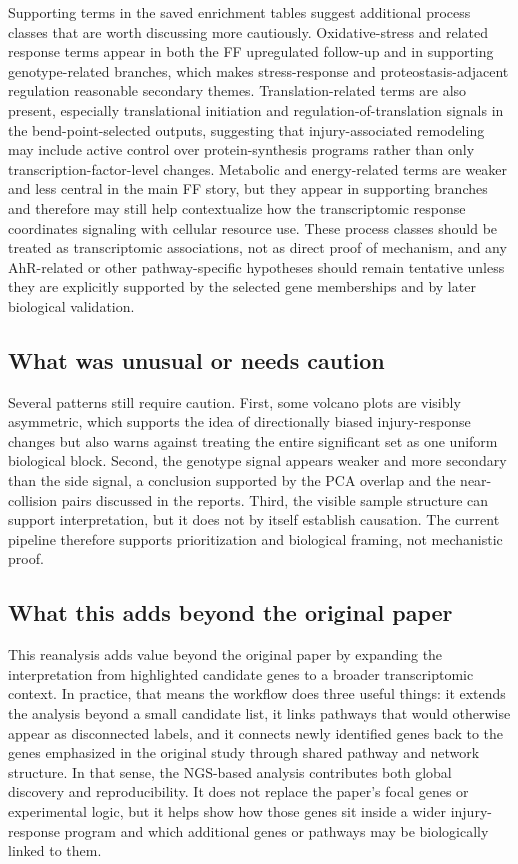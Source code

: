 \documentclass[12pt]{article}
\begin{document}
Supporting terms in the saved enrichment tables suggest additional process classes that are worth discussing more cautiously. Oxidative-stress and related response terms appear in both the FF upregulated follow-up and in supporting genotype-related branches, which makes stress-response and proteostasis-adjacent regulation reasonable secondary themes. Translation-related terms are also present, especially translational initiation and regulation-of-translation signals in the bend-point-selected outputs, suggesting that injury-associated remodeling may include active control over protein-synthesis programs rather than only transcription-factor-level changes. Metabolic and energy-related terms are weaker and less central in the main FF story, but they appear in supporting branches and therefore may still help contextualize how the transcriptomic response coordinates signaling with cellular resource use. These process classes should be treated as transcriptomic associations, not as direct proof of mechanism, and any AhR-related or other pathway-specific hypotheses should remain tentative unless they are explicitly supported by the selected gene memberships and by later biological validation.

\subsection{What was unusual or needs caution}

Several patterns still require caution. First, some volcano plots are visibly asymmetric, which supports the idea of directionally biased injury-response changes but also warns against treating the entire significant set as one uniform biological block. Second, the genotype signal appears weaker and more secondary than the side signal, a conclusion supported by the PCA overlap and the near-collision pairs discussed in the reports. Third, the visible sample structure can support interpretation, but it does not by itself establish causation. The current pipeline therefore supports prioritization and biological framing, not mechanistic proof.

\subsection{What this adds beyond the original paper}

This reanalysis adds value beyond the original paper by expanding the interpretation from highlighted candidate genes to a broader transcriptomic context. In practice, that means the workflow does three useful things: it extends the analysis beyond a small candidate list, it links pathways that would otherwise appear as disconnected labels, and it connects newly identified genes back to the genes emphasized in the original study through shared pathway and network structure. In that sense, the NGS-based analysis contributes both global discovery and reproducibility. It does not replace the paper’s focal genes or experimental logic, but it helps show how those genes sit inside a wider injury-response program and which additional genes or pathways may be biologically linked to them.
\end{document}
